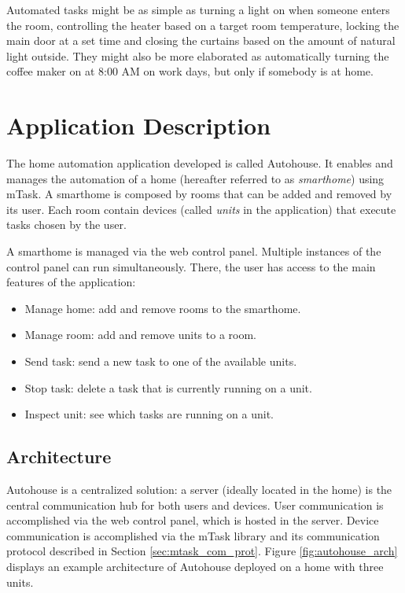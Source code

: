 Automated tasks might be as simple as turning a light on when someone enters the room, controlling the heater based on a target room temperature, locking the main door at a set time and closing the curtains based on the amount of natural light outside. They might also be more elaborated as automatically turning the coffee maker on at 8:00 AM on work days, but only if somebody is at home.

\section{Application Description}\label{sec:app_desc}

The home automation application developed is called Autohouse. It enables and manages the automation of a home (hereafter referred to as \textit{smarthome}) using \gls{mTask}. A smarthome is composed by rooms that can be added and removed by its user. Each room contain devices (called \textit{units} in the application) that execute tasks chosen by the user. 

A smarthome is managed via the web control panel. Multiple instances of the control panel can run simultaneously. There, the user has access to the main features of the application:

\begin{itemize}
    \item Manage home: add and remove rooms to the smarthome.
    \item Manage room: add and remove units to a room.
    \item Send task: send a new task to one of the available units.
    \item Stop task: delete a task that is currently running on a unit.
    \item Inspect unit: see which tasks are running on a unit.
\end{itemize}

\subsection{Architecture}

Autohouse is a centralized solution: a server (ideally located in the home) is the central communication hub for both users and devices. User communication is accomplished via the web control panel, which is hosted in the server. Device communication is accomplished via the \gls{mTask} library and its communication protocol described in Section \ref{sec:mtask_com_prot}. Figure \ref{fig:autohouse_arch} displays an example architecture of Autohouse deployed on a home with three units. 

